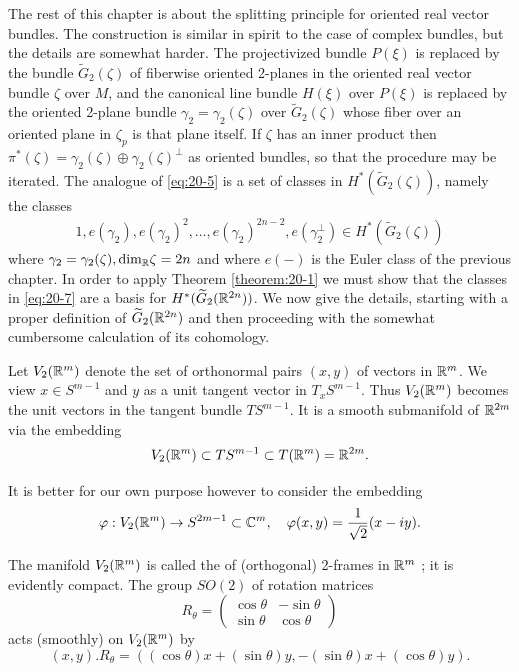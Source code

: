 The rest of this chapter is about the splitting principle for oriented real vector bundles. The construction 
is similar in spirit to the case of complex bundles, but the details are somewhat harder. The projectivized 
bundle $P( \xi )$ is replaced by the bundle $\widetilde{G}_{2}( \zeta )$ of fiberwise oriented 2-planes 
in the oriented real vector bundle $\zeta$ over $M$, and the canonical line bundle $H( \xi )$ over $P( \xi )$ 
is replaced by the oriented 2-plane bundle ${\gamma }_{2} = {\gamma }_{2}( \zeta )$ over $\widetilde{G}_{2}( \zeta )$ 
whose fiber over an oriented plane in ${\zeta }_{p}$ is that plane itself. If $\zeta$ has an inner product 
then ${\pi }^*( \zeta )  = {\gamma }_{2}( \zeta )  \oplus  {\gamma }_{2}{( \zeta ) }^{ \bot  }$ as oriented 
bundles, so that the procedure may be iterated. The analogue of \eqref{eq:20-5} is a set of classes 
in $H^*( {\widetilde{G}_{2}( \zeta ) })$, namely the classes
\begin{align}\label{eq:20-7}
  1, e( {\gamma }_{2}), e{( {\gamma }_{2}) }^{2}, 
  \ldots, e{( {\gamma }_{2}) }^{{2n}- 2}, e( {\gamma }_{2}^{ \bot  })  
  \in  H^*( {\widetilde{G}_{2}( \zeta ) })
\end{align}
where ${\gamma }_{2} = {\gamma }_{2}( \zeta ),{\dim }_{{\mathbb{R}}}\zeta  = {2n}$ and where $e(-)$ is the 
Euler class of the previous chapter. In order to apply Theorem \ref{theorem:20-1} we must show that the classes in \eqref{eq:20-7} 
are a basis for $H^*( {\widetilde{G}_{2}( {\mathbb{R}}^{2n}) })$. We now give the details, starting with a proper 
definition of $\widetilde{G}_{2}( {\mathbb{R}}^{2n})$ and then proceeding with the somewhat cumbersome calculation 
of its cohomology.

Let ${V}_{2}( {{\mathbb{R}}^m})$ denote the set of orthonormal pairs $(x, y)$ of vectors in ${{\mathbb{R}}^m}$. We 
view $x \in  {S}^{m- 1}$ and $y$ as a unit tangent vector in ${T}_{x}{S}^{m- 1}$. Thus ${V}_{2}( {{\mathbb{R}}^m})$ 
becomes the unit vectors in the tangent bundle $T{S}^{m- 1}$. It is a smooth submanifold of ${\mathbb{R}}^{2m}$ 
via the embedding
\[
  {V}_{2}( {{\mathbb{R}}^m})  \subset  T{S}^{m- 1} \subset  T( {{\mathbb{R}}^m})  = {\mathbb{R}}^{2m}.
\]

It is better for our own purpose however to consider the embedding
\begin{align}\label{eq:20-8}
  \varphi: {V}_{2}( {{\mathbb{R}}^m})  \rightarrow  {S}^{{2m}- 1} \subset  {\ensuremath{\mathbb{C}}}^{m},\quad
  \varphi ( {x,y})  = \frac{1}{\sqrt{2}}( {x- {iy}}).
\end{align}

The manifold ${V}_{2}( {{\mathbb{R}}^m})$ is called the  of (orthogonal) 2-frames 
in ${{\mathbb{R}}^m}$ ; it is evidently compact. The group ${SO}(2)$ of rotation matrices
\[
  {R}_{\theta } = \begin{pmatrix} 
    \cos \theta & -\sin \theta \\  
    \sin \theta & \cos \theta  
  \end{pmatrix}
\]
acts (smoothly) on ${V}_{2}( {{\mathbb{R}}^m})$ by
\[
  (x, y).R_\theta = ( 
      ( {\cos \theta }) x + ( {\sin \theta }) y,
    - ( {\sin \theta }) x + ( {\cos \theta }) y
  ).
\]

